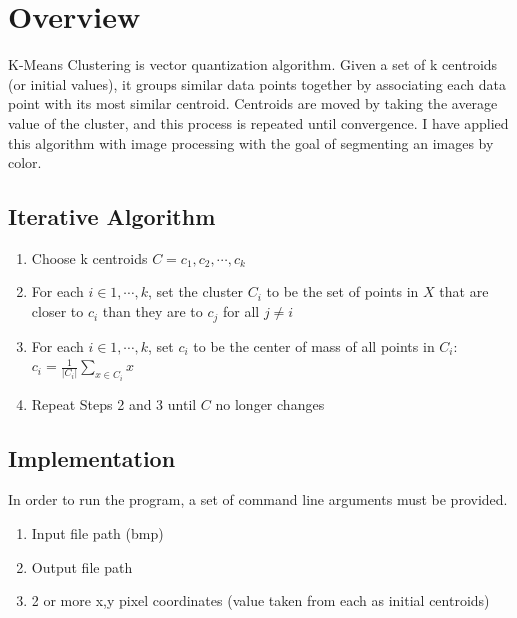 \documentclass[11pt]{article}
\begin{document}
\maketitle

\section*{Overview}

K-Means Clustering is vector quantization algorithm. Given a set of k centroids
(or initial values), it groups similar data points together by associating each 
data point with its most similar centroid. Centroids are moved by taking the 
average value of the cluster, and this process is repeated until convergence. I
have applied this algorithm with image processing with the goal of segmenting 
an images by color. 

\subsection{Iterative Algorithm}

\begin{enumerate}
\item Choose k centroids $C = {c_1, c_2, \cdots, c_k}$
\item For each $i \in {1, \cdots, k}$, set the cluster $C_i$ to be the set of points in $X$ that are closer to $c_i$ than they are to $c_j$ for all $j \neq i$
\item For each $i \in {1, \cdots, k}$, set $c_i$ to be the center of mass of all points in $C_i$: $c_i = \frac{1}{|C_i|}\sum_{x \in C_i}x$
\item Repeat Steps 2 and 3 until $C$ no longer changes
\end{enumerate}

\subsection{Implementation}

In order to run the program, a set of command line arguments must be provided.

\begin{enumerate}
\item Input file path (bmp)
\item Output file path
\item 2 or more x,y pixel coordinates (value taken from each as initial centroids)
\end{enumerate}
\end{document}
